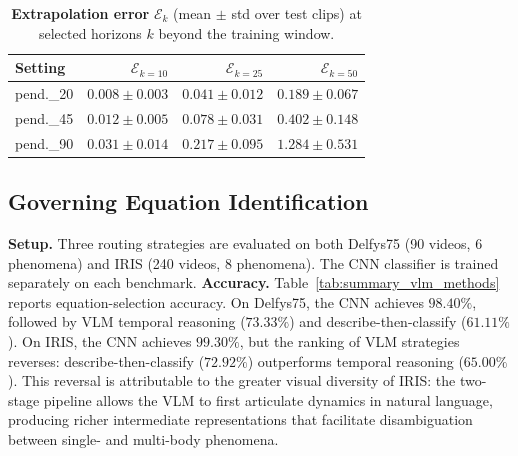 \documentclass[runningheads]{llncs}
\begin{document}
\begin{table}[t]
  \centering
  \caption{\textbf{Extrapolation error} $\mathcal{E}_k$ (mean $\pm$ std over test clips) at selected horizons $k$ beyond the training window.}
  \label{tab:extrapolation}
  \footnotesize
  \setlength{\tabcolsep}{5pt}
  \renewcommand{\arraystretch}{1.2}
  \begin{tabular}{@{}lrrr@{}}
    \toprule
    \textbf{Setting} & $\mathcal{E}_{k=10}$ & $\mathcal{E}_{k=25}$ & $\mathcal{E}_{k=50}$ \\
    \midrule
    pend.\_20 & $0.008 \pm 0.003$ & $0.041 \pm 0.012$ & $0.189 \pm 0.067$ \\
    pend.\_45 & $0.012 \pm 0.005$ & $0.078 \pm 0.031$ & $0.402 \pm 0.148$ \\
    pend.\_90 & $0.031 \pm 0.014$ & $0.217 \pm 0.095$ & $1.284 \pm 0.531$ \\
    \bottomrule
  \end{tabular}
\end{table}




\subsection{Governing Equation Identification}
\label{sec:exp_eq_identification}
\noindent
\textbf{Setup.} Three routing strategies are evaluated on both Delfys75 (90 videos, 6 phenomena) and IRIS (240 videos, 8 phenomena). The CNN classifier is trained separately on each benchmark.
\textbf{Accuracy.} Table~\ref{tab:summary_vlm_methods} reports equation-selection accuracy. On Delfys75, the CNN achieves $98.40\%$, followed by VLM temporal reasoning ($73.33\%$) and describe-then-classify ($61.11\%$). On IRIS, the CNN achieves $99.30\%$, but the ranking of VLM strategies reverses: describe-then-classify ($72.92\%$) outperforms temporal reasoning ($65.00\%$). This reversal is attributable to the greater visual diversity of IRIS: the two-stage pipeline allows the VLM to first articulate dynamics in natural language, producing richer intermediate representations that facilitate disambiguation between single- and multi-body phenomena.
\end{document}
